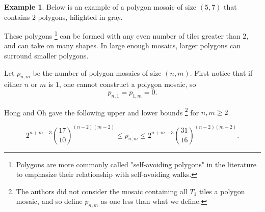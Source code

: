\documentclass[12pt]{article}
\theoremstyle{plain}
\theoremstyle{definition}
\theoremstyle{remark}
\theoremstyle{definition}
\newtheorem{exmp}{Example}[section]
\newcommand{\cell}[4]{ \draw[thick] ( #1 , #2 ) rectangle ( #3 , #4 );}
\newcommand{\cellAf}[4]{\filldraw[gray!40] ( #1 , #2 ) rectangle ( #3 , #4 ); \draw[thick] ( #1 , #2 ) rectangle ( #3 , #4 ); \draw[red, thick, densely dotted] (#3 * 0.5 + #1 * 0.5 , #2) -- (#3, #4 * 0.5 + #2 * 0.5);}
\newcommand{\cellBf}[4]{\filldraw[gray!40] ( #1 , #2 ) rectangle ( #3 , #4 ); \draw[thick] ( #1 , #2 ) rectangle ( #3 , #4 ); \draw[red, thick, densely dotted] (#3 * 0.5 + #1 * 0.5 , #2) -- (#1, #4 * 0.5 + #2 * 0.5);}
\newcommand{\cellCf}[4]{\filldraw[gray!40] ( #1 , #2 ) rectangle ( #3 , #4 ); \draw[thick] ( #1 , #2 ) rectangle ( #3 , #4 ); \draw[red, thick, densely dotted] (#3 * 0.5 + #1 * 0.5 , #4) -- (#1, #4 * 0.5 + #2 * 0.5);}
\newcommand{\cellDf}[4]{\filldraw[gray!40] ( #1 , #2 ) rectangle ( #3 , #4 ); \draw[thick] ( #1 , #2 ) rectangle ( #3 , #4 ); \draw[red, thick, densely dotted] (#3 * 0.5 + #1 * 0.5 , #4) -- (#3, #4 * 0.5 + #2 * 0.5);}
\newcommand{\cellEf}[4]{\filldraw[gray!40] ( #1 , #2 ) rectangle ( #3 , #4 ); \draw[thick] ( #1 , #2 ) rectangle ( #3 , #4 ); \draw[red, thick, densely dotted] (#3 * 0.5 + #1 * 0.5 , #2) -- (#3 * 0.5 + #1 * 0.5 , #4);}
\newcommand{\cellFf}[4]{\filldraw[gray!40] ( #1 , #2 ) rectangle ( #3 , #4 ); \draw[thick] ( #1 , #2 ) rectangle ( #3 , #4 ); \draw[red, thick, densely dotted] (#3, #4 * 0.5 + #2 * 0.5) -- (#1, #4 * 0.5 + #2 * 0.5);}
\begin{document}
\begin{exmp}
\label{exmp: clean sap}
Below is an example of a polygon mosaic of size $(5,7)$ that contains $2$ polygons, hilighted in gray.

\begin{center}
\end{center}
\end{exmp}

These polygons \footnote{Polygons are more commonly called "self-avoiding polygons" in the literature to emphasize their relationship with self-avoiding walks.} can be formed with any even number of tiles greater than $2$, and can take on many shapes. In large enough mosaics, larger polygons can surround smaller polygons. 

Let $p_{n,m}$ be the number of polygon mosaics of size $(n,m)$. First notice that if either $n$ or $m$ is $1$, one cannot construct a polygon mosaic, so 
$$p_{n,1} = p_{1,m} = 0.$$

Hong and Oh \cite[Hong2018]{Hong2018} gave the following upper and lower bounds \footnote{The authors did not consider the mosaic containing all $T_1$ tiles a polygon mosaic, and so define $p_{n,m}$ as one less than what we define.} for $n,m \geq 2$. 

$$2^{n+m-3} \left(\frac{17}{10}\right)^{(n-2)(m-2)} \leq p_{n,m} \leq 2^{n+m-3} \left(\frac{31}{16}\right)^{(n-2)(m-2)}.$$
\end{document}
